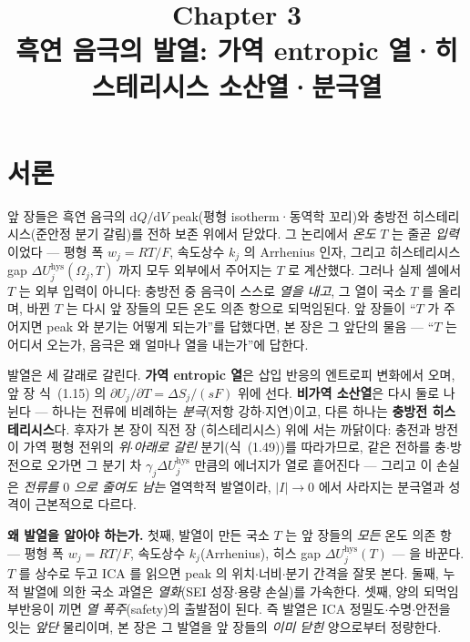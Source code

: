 \documentclass[11pt,a4paper]{article}
\title{\textbf{\LARGE Chapter 3}\\[0.35em]\Large 흑연 음극의 발열: 가역 entropic 열·히스테리시스 소산열·분극열}
\author{}
\date{}
\newcommand{\dd}{\mathrm{d}}
\newcommand{\hys}{\mathrm{hys}}
\begin{document}
\maketitle

\section*{서론}
앞 장들은 흑연 음극의 $\dd Q/\dd V$ peak(평형 isotherm·동역학 꼬리)와 충방전 히스테리시스(준안정 분기 갈림)를
전하 보존 위에서 닫았다. 그 논리에서 \emph{온도} $T$ 는 줄곧 \emph{입력}이었다 — 평형 폭 $w_j=RT/F$, 속도상수
$k_j$ 의 Arrhenius 인자, 그리고 히스테리시스 gap $\Delta U_j^\hys(\Omega_j,T)$ 까지 모두 외부에서 주어지는 $T$ 로
계산했다. 그러나 실제 셀에서 $T$ 는 외부 입력이 아니다: 충방전 중 음극이 스스로 \emph{열을 내고}, 그 열이 국소
$T$ 를 올리며, 바뀐 $T$ 는 다시 앞 장들의 모든 온도 의존 항으로 되먹임된다. 앞 장들이 ``$T$ 가 주어지면 peak 와
분기는 어떻게 되는가''를 답했다면, 본 장은 그 앞단의 물음 — ``$T$ 는 어디서 오는가, 음극은 왜 얼마나 열을
내는가''에 답한다.

발열은 세 갈래로 갈린다. \textbf{가역 entropic 열}은 삽입 반응의 엔트로피 변화에서 오며, 앞 장 식~(1.15) 의
$\partial U_j/\partial T=\Delta S_j/(sF)$ 위에 선다. \textbf{비가역 소산열}은 다시 둘로 나뉜다 — 하나는 전류에
비례하는 \emph{분극}(저항 강하$\cdot$지연)이고, 다른 하나는 \textbf{충방전 히스테리시스}다. 후자가 본 장이 직전 장
(히스테리시스) 위에 서는 까닭이다: 충전과 방전이 가역 평형 전위의 \emph{위$\cdot$아래로 갈린} 분기(식~(1.49))를
따라가므로, 같은 전하를 충$\cdot$방전으로 오가면 그 분기 차 $\gamma_j\Delta U_j^\hys$ 만큼의 에너지가 열로
흩어진다 — 그리고 이 손실은 \emph{전류를 $0$ 으로 줄여도 남는} 열역학적 발열이라, $|I|\to0$ 에서 사라지는 분극열과
성격이 근본적으로 다르다.

\textbf{왜 발열을 알아야 하는가.} 첫째, 발열이 만든 국소 $T$ 는 앞 장들의 \emph{모든} 온도 의존 항 — 평형 폭
$w_j=RT/F$, 속도상수 $k_j$(Arrhenius), 히스 gap $\Delta U_j^\hys(T)$ — 을 바꾼다. $T$ 를 상수로 두고 ICA 를
읽으면 peak 의 위치$\cdot$너비$\cdot$분기 간격을 잘못 본다. 둘째, 누적 발열에 의한 국소 과열은 \emph{열화}(SEI
성장$\cdot$용량 손실)를 가속한다. 셋째, 양의 되먹임 부반응이 끼면 \emph{열 폭주}(safety)의 출발점이 된다. 즉
발열은 ICA 정밀도$\cdot$수명$\cdot$안전을 잇는 \emph{앞단} 물리이며, 본 장은 그 발열을 앞 장들의 \emph{이미 닫힌}
양으로부터 정량한다.
\end{document}
